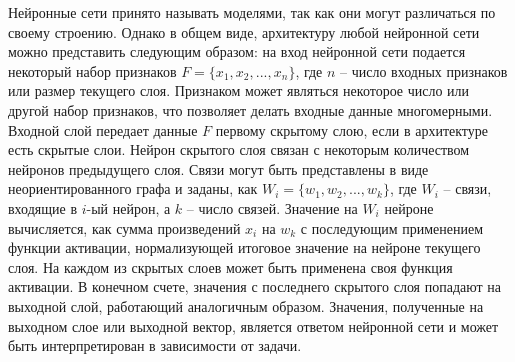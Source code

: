Нейронные сети принято называть моделями, так как они могут различаться по своему строению. Однако в общем виде, архитектуру любой нейронной сети можно представить следующим образом: на вход нейронной сети подается некоторый набор признаков $F = \{x_1, x_2, ..., x_n\}$, где $n$ -- число входных признаков или размер текущего слоя. Признаком может являться некоторое число или другой набор признаков, что позволяет делать входные данные многомерными. Входной слой передает данные $F$ первому скрытому слою, если в архитектуре есть скрытые слои. Нейрон скрытого слоя связан с некоторым количеством нейронов предыдущего слоя. Связи могут быть представлены в виде неориентированного графа и заданы, как $W_i = \{w_1, w_2, ..., w_k\}$, где $W_i$ -- связи, входящие в $i$-ый нейрон, а $k$ -- число связей. Значение на $W_i$ нейроне вычисляется, как сумма произведений $x_i$ на $w_k$ с последующим применением функции активации, нормализующей итоговое значение на нейроне текущего слоя. На каждом из скрытых слоев может быть применена своя функция активации. В конечном счете, значения с последнего скрытого слоя попадают на выходной слой, работающий аналогичным образом. Значения, полученные на выходном слое или выходной вектор, является ответом нейронной сети и может быть интерпретирован в зависимости от задачи.
